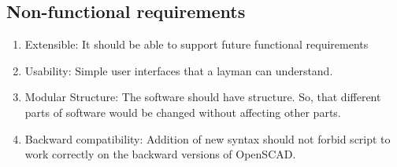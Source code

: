 \subsection{Non-functional requirements}
\begin{enumerate}
	\item Extensible: It should be able to support future functional requirements
	\item Usability: Simple user interfaces that a layman can understand.
	\item Modular Structure: The software should have  structure. So, that different parts of software would be changed without affecting other parts.
	\item Backward compatibility: Addition of new syntax should not forbid script to work correctly on the backward versions of OpenSCAD.
\end{enumerate}


